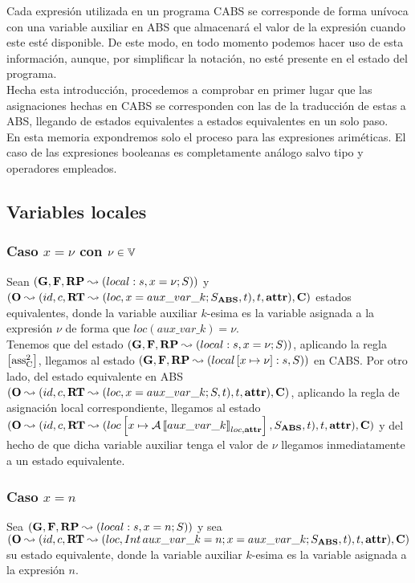 Cada expresión utilizada en un programa CABS se corresponde de forma unívoca con una variable auxiliar en ABS que almacenará el valor de la expresión cuando este esté disponible. De este modo, en todo momento podemos hacer uso de esta información, aunque, por simplificar la notación, no esté presente en el estado del programa.\\

Hecha esta introducción, procedemos a comprobar en primer lugar que las asignaciones hechas en CABS se corresponden con las de la traducción de estas a ABS, llegando de estados equivalentes a estados equivalentes en un solo paso.\\

En esta memoria expondremos solo el proceso para las expresiones ariméticas. El caso de las expresiones booleanas es completamente análogo salvo tipo y operadores empleados.

\subsection{Variables locales}

\subsubsection{Caso $x = \nu$ con $\nu \in \mathbb{V}$}
Sean $(\mathbf{G}, \mathbf{F}, \textbf{RP} \leadsto (local:s,x = \nu\mbox{;\,}S))$ y $(\mathbf{O} \leadsto (id, c, \textbf{RT} \leadsto (loc, x = aux\_var\_k\mbox{;\,} S_{\textbf{ABS}}, t), t, \textbf{attr}), \mathbf{C})$ estados equivalentes, donde la variable auxiliar $k$-esima es la variable asignada a la expresión $\nu$ de forma que $loc(aux\_var\_k) = \nu$.\\

Tenemos que del estado $(\mathbf{G}, \mathbf{F}, \textbf{RP} \leadsto (local:s,x = \nu\mbox{;\,}S))$, aplicando la regla $\left[ \text{ass}_{\text{C}}^{2} \right]$, llegamos al estado $(\mathbf{G}, \mathbf{F}, \textbf{RP} \leadsto (local\left[ x\mapsto\nu \right]:s, S))$ en CABS. Por otro lado, del estado equivalente en ABS $(\mathbf{O} \leadsto (id, c, \textbf{RT} \leadsto (loc, x = aux\_var\_k\mbox{;\,} S, t), t, \textbf{attr}), \mathbf{C})$, aplicando la regla de asignación local correspondiente, llegamos al estado $(\mathbf{O} \leadsto (id, c, \textbf{RT} \leadsto (loc \left[ x\mapsto\mathcal{A} \left\llbracket aux\_var\_k \right\rrbracket_{loc, \textbf{attr}} \right], S_{\textbf{ABS}}, t), t, \textbf{attr}), \mathbf{C})$ y del hecho de que dicha variable auxiliar tenga el valor de $\nu$ llegamos inmediatamente a un estado equivalente.

\subsubsection{Caso $x = n$}
Sea $(\mathbf{G}, \mathbf{F}, \textbf{RP} \leadsto (local:s,x = n\mbox{;\,}S))$ y sea $(\mathbf{O} \leadsto (id, c, \textbf{RT} \leadsto (loc, Int\,aux\_var\_k = n\mbox{;\,} x = aux\_var\_k\mbox{;\,} S_{\textbf{ABS}}, t), t, \textbf{attr}), \mathbf{C})$ su estado equivalente, donde la variable auxiliar $k$-esima es la variable asignada a la expresión $n$.\\


